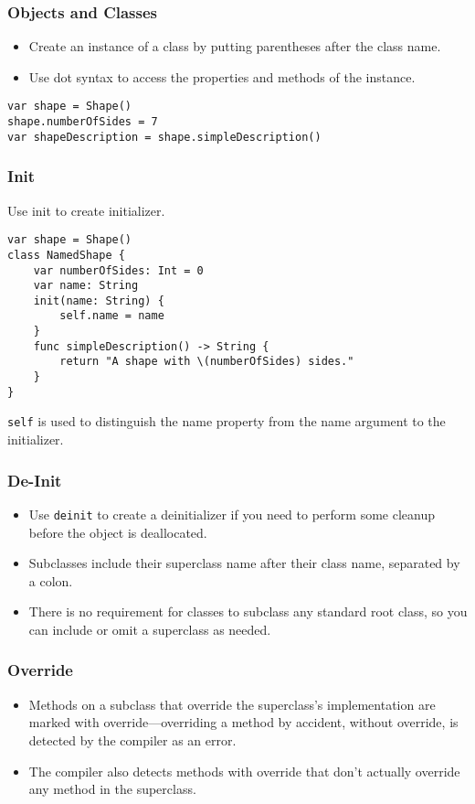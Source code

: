 \begin{frame}[fragile] \frametitle{Objects and Classes}
\begin{itemize}
\item Create an instance of a class by putting parentheses after the class name. 
\item Use dot syntax to access the properties and methods of the instance.
\end{itemize}

\begin{lstlisting}[basicstyle=\scriptsize]
var shape = Shape()
shape.numberOfSides = 7
var shapeDescription = shape.simpleDescription()
\end{lstlisting}


\end{frame}


\begin{frame}[fragile] \frametitle{Init}
Use init to create initializer.

\begin{lstlisting}[basicstyle=\scriptsize]
var shape = Shape()
class NamedShape {
    var numberOfSides: Int = 0
    var name: String
    init(name: String) {
        self.name = name
    }
    func simpleDescription() -> String {
        return "A shape with \(numberOfSides) sides."
    }
}
\end{lstlisting}

\lstinline|self| is used to distinguish the name property from the name argument to the initializer. 
\end{frame}


\begin{frame}[fragile] \frametitle{De-Init}
\begin{itemize}
\item Use \lstinline|deinit| to create a deinitializer if you need to perform some cleanup before the object is deallocated.
\item Subclasses include their superclass name after their class name, separated by a colon. 
\item There is no requirement for classes to subclass any standard root class, so you can include or omit a superclass as needed.
\end{itemize}


\end{frame}


\begin{frame}[fragile] \frametitle{Override}
\begin{itemize}
\item Methods on a subclass that override the superclass’s implementation are marked with override—overriding a method by accident, without override, is detected by the compiler as an error. 
\item The compiler also detects methods with override that don’t actually override any method in the superclass.
\end{itemize}


\end{frame}

